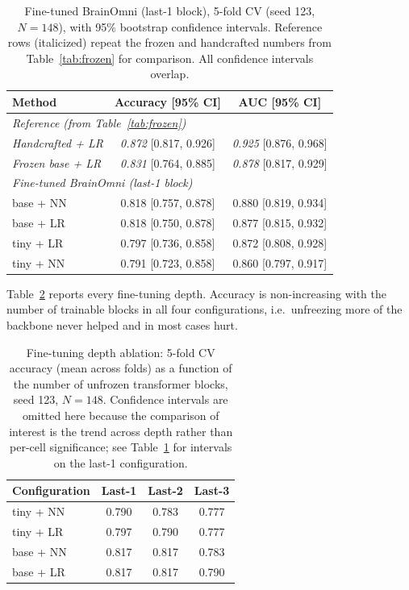 \documentclass[11pt]{article}
\begin{document}
\begin{table}[h]
\centering
\begin{tabular}{|l|c|c|}
\hline
Method & Accuracy [95\% CI] & AUC [95\% CI] \\
\hline
\multicolumn{3}{|l|}{\textit{Reference (from Table~\ref{tab:frozen})}} \\
\hline
\quad \textit{Handcrafted + LR}     & \textit{0.872} [0.817, 0.926] & \textit{0.925} [0.876, 0.968] \\
\hline
\quad \textit{Frozen base + LR}     & \textit{0.831} [0.764, 0.885] & \textit{0.878} [0.817, 0.929] \\
\hline
\multicolumn{3}{|l|}{\textit{Fine-tuned BrainOmni (last-1 block)}} \\
\hline
\quad base + NN                    & 0.818 [0.757, 0.878] & 0.880 [0.819, 0.934] \\
\hline
\quad base + LR                    & 0.818 [0.750, 0.878] & 0.877 [0.815, 0.932] \\
\hline
\quad tiny + LR                    & 0.797 [0.736, 0.858] & 0.872 [0.808, 0.928] \\
\hline
\quad tiny + NN                    & 0.791 [0.723, 0.858] & 0.860 [0.797, 0.917] \\
\hline
\end{tabular}
\caption{Fine-tuned BrainOmni (last-1 block), 5-fold CV (seed 123, $N=148$), with 95\% bootstrap
confidence intervals. Reference rows (italicized) repeat the frozen and handcrafted numbers from
Table~\ref{tab:frozen} for comparison. All confidence intervals overlap.}
\label{tab:finetune}
\end{table}

Table~\ref{tab:depth} reports every fine-tuning depth. Accuracy is non-increasing with the number
of trainable blocks in all four configurations, i.e.\ unfreezing more of the backbone never helped
and in most cases hurt.

\begin{table}[h]
\centering
\begin{tabular}{|l|c|c|c|}
\hline
Configuration & Last-1 & Last-2 & Last-3 \\
\hline
tiny + NN & 0.790 & 0.783 & 0.777 \\
\hline
tiny + LR & 0.797 & 0.790 & 0.777 \\
\hline
base + NN & 0.817 & 0.817 & 0.783 \\
\hline
base + LR & 0.817 & 0.817 & 0.790 \\
\hline
\end{tabular}
\caption{Fine-tuning depth ablation: 5-fold CV accuracy (mean across folds) as a function of the
number of unfrozen transformer blocks, seed 123, $N=148$. Confidence intervals are omitted here
because the comparison of interest is the trend across depth rather than per-cell significance;
see Table~\ref{tab:finetune} for intervals on the last-1 configuration.}
\label{tab:depth}
\end{table}
\end{document}
